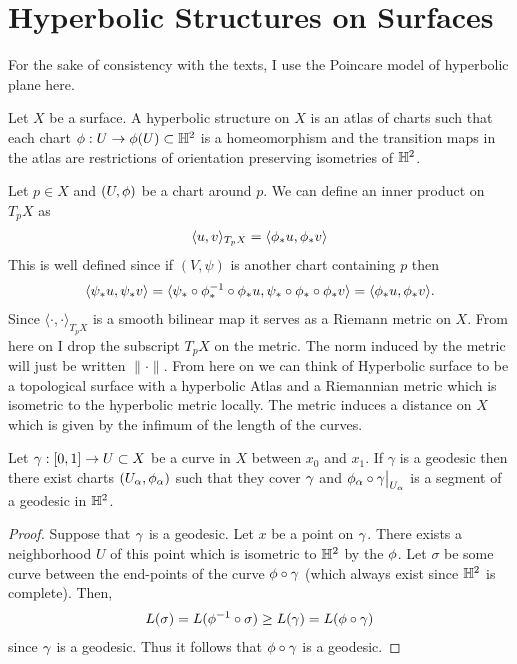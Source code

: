 \section{Hyperbolic Structures on Surfaces}
For the sake of consistency with the texts, I use the Poincare model of hyperbolic plane here.
\begin{definition}
  Let $X$ be a surface. A hyperbolic structure on $X$ is an atlas of charts such that each chart $\phi:U\to \phi(U)\subset \mathbb{H}^2$ is a homeomorphism and the transition maps in the atlas are restrictions of orientation preserving isometries of $\mathbb{H}^2$.
\end{definition}

Let $p\in X$ and $(U,\phi)$ be a chart around $p$. We can define an inner product on $T_p X$ as
\begin{align*}
  \langle u,v \rangle_{T_pX} = \langle \phi_* u, \phi_* v \rangle  
\end{align*}
This is well defined since if $(V,\psi)$ is another chart containing $p$ then
\begin{align*}
  \langle \psi_* u, \psi_* v \rangle = \langle \psi_*\circ \phi_*^{-1}\circ \phi_* u, \psi_*\circ\phi_*\circ \phi_* v \rangle = \langle \phi_* u, \phi_* v \rangle.
\end{align*}
Since $\langle \cdot, \cdot \rangle_{T_pX}$ is a smooth bilinear map it serves as a Riemann metric on $X$. From here on I drop the subscript $T_pX$ on the metric. The norm induced by the metric will just be written $\|\cdot\|$. From here on we can think of Hyperbolic surface to be a topological surface with a hyperbolic Atlas and a Riemannian metric which is isometric to the hyperbolic metric locally. The metric induces a distance on $X$ which is given by the infimum of the length of the curves.
\begin{proposition}
  Let $\gamma:[0,1] \to U\subset X$ be a curve in $X$ between $x_0$ and $x_1$. If $\gamma$ is a geodesic then there exist charts $(U_\alpha,\phi_\alpha)$ such that they cover $\gamma$ and $\phi_\alpha\circ \gamma\big|_{U_\alpha}$ is a segment of a geodesic in $\mathbb{H}^2$. 
\end{proposition}
\begin{proof}
  Suppose that $\gamma$ is a geodesic. Let $x$ be a point on $\gamma$. There exists a neighborhood $U$ of this point which is isometric to $\mathbb{H}^2$ by the $\phi$. Let $\sigma$ be some curve between the end-points of the curve $\phi\circ \gamma$ (which always exist since $\mathbb{H}^2$ is complete). Then,
  \begin{align*}
    L(\sigma) = L(\phi^{-1}\circ \sigma) \geq L(\gamma) = L(\phi\circ\gamma)
  \end{align*}
  since $\gamma$ is a geodesic. Thus it follows that $\phi\circ \gamma$ is a geodesic.
\end{proof}

